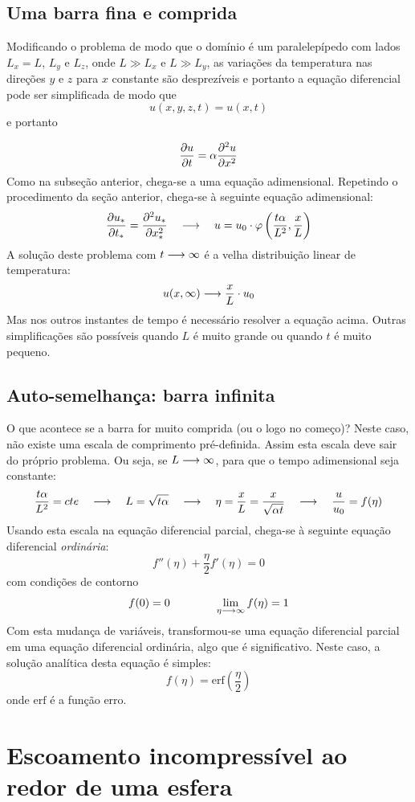 \subsection{Uma barra fina e comprida}

Modificando o problema de modo que o domínio é um paralelepípedo com lados $L_x=L$, $L_y$ e $L_z$, onde $L \gg L_x$ e $L \gg L_y$, as variações da temperatura nas direções $y$ e $z$ para $x$ constante são desprezíveis e portanto a equação diferencial pode ser simplificada de modo que 
\[
u(x, y, z, t) = u(x, t)
\]
e portanto

\[
\frac{\partial u}{\partial t} = \alpha \frac{\partial^2 u}{\partial x^2}
\]
Como na subseção anterior, chega-se a uma equação adimensional. Repetindo o procedimento da seção anterior, chega-se à seguinte equação adimensional:
\[
\frac{\partial u_*}{\partial t_*} = \frac{\partial^2 u_*}{\partial x_*^2} \quad\longrightarrow\quad u = u_0\cdot\varphi\left(\frac{t\alpha}{L^2}, \frac{x}{L}\right)
\]
A solução deste problema com $t\longrightarrow\infty$ é a velha distribuição linear de temperatura:
\[
u(x,\infty) \longrightarrow \frac{x}{L}\cdot u_0
\]
Mas nos outros instantes de tempo é necessário resolver a equação acima. Outras simplificações são possíveis quando $L$ é muito grande ou quando $t$ é muito pequeno.

\subsection{Auto-semelhança: barra infinita}
O que acontece se a barra for muito comprida (ou o logo no começo)? Neste caso, não existe uma escala de comprimento pré-definida. Assim esta escala deve sair do próprio problema. Ou seja, se $L\longrightarrow\infty$, para que o tempo adimensional seja constante:
\[
\frac{t\alpha}{L^2} = cte \quad\longrightarrow\quad L = \sqrt{t\alpha} \quad\longrightarrow\quad \eta = \frac{x}{L} = \frac{x}{\sqrt{\alpha t}} \quad\longrightarrow\quad \frac{u}{u_0} = f(\eta)
\]
Usando esta escala na equação diferencial parcial, chega-se à seguinte equação diferencial \emph{ordinária}:
\[
f''(\eta) + \frac{\eta}{2} f'(\eta) = 0
\]
com condições de contorno
\[
f(0) = 0 \qquad\qquad \lim_{\eta\longrightarrow\infty} f(\eta) = 1
\]
Com esta mudança de variáveis, transformou-se uma equação diferencial parcial em uma equação diferencial ordinária, algo que é significativo. Neste caso, a solução analítica desta equação é simples:
\[
f(\eta) = \mathrm{erf}\left(\frac{\eta}{2}\right)
\]
onde $\mathrm{erf}$ é a função erro.

\section{Escoamento incompressível ao redor de uma esfera}


